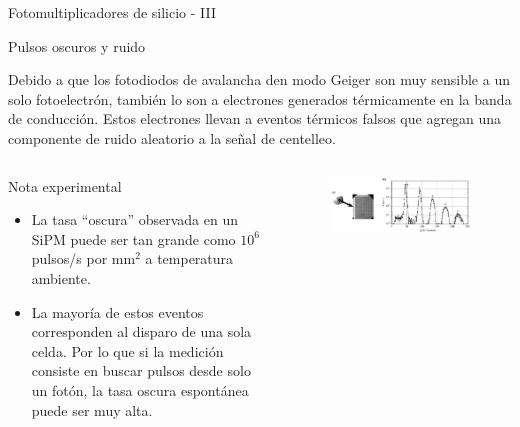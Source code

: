 \documentclass[a4paper,10pt]{beamer}
\begin{document}
\begin{frame}{Fotomultiplicadores de silicio - III}
 
 {\large{\color{blue}Pulsos oscuros y ruido}}
 
 \begin{justify}
  Debido a que los fotodiodos de avalancha den modo Geiger son muy sensible a 
  un solo fotoelectrón, también lo son a electrones generados térmicamente en la 
  banda de conducción. Estos electrones llevan a eventos térmicos falsos que 
  agregan una componente de ruido aleatorio a la señal de centelleo.
 \end{justify}
 
 \begin{columns}[c]
 
 \column{2in}
 \begin{exampleblock}{Nota experimental}
 \small
  \begin{itemize}
   \item \begin{justify}
          La tasa ``oscura'' observada en un SiPM puede ser tan grande como $10^6$
          pulsos/s por mm$^2$ a temperatura ambiente.
         \end{justify}
         \item \begin{justify}
         La mayoría de estos eventos corresponden al disparo de una sola celda. Por 
         lo que si la medición consiste en buscar pulsos desde solo un fotón, la 
         tasa oscura espontánea puede ser muy alta.
         \end{justify}
  \end{itemize}
  
 \end{exampleblock}
 
 \column{2.3in}
  \begin{figure}
   \center
   \includegraphics[scale=0.27]{fig42}
  \end{figure} 
  
  
  \end{columns}
\end{frame}
\end{document}
